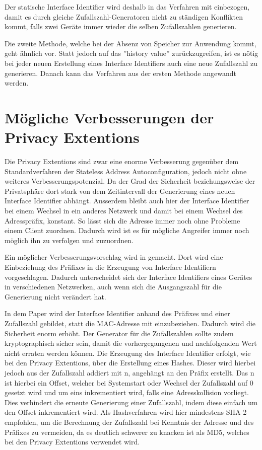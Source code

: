 \documentclass[a4paper, 12pt]{scrartcl}
\begin{document}
Der statische Interface Identifier wird deshalb in das Verfahren mit einbezogen, damit es durch gleiche Zufallszahl-Generatoren nicht zu ständigen Konflikten kommt, falls zwei Geräte immer wieder die selben Zufallszahlen generieren.


Die zweite Methode, welche bei der Absenz von Speicher zur Anwendung kommt, geht ähnlich vor.
Statt jedoch auf das ''history value'' zurückzugreifen, ist es nötig bei jeder neuen Erstellung eines Interface Identifiers auch eine neue Zufallszahl zu generieren. 
Danach kann das Verfahren aus der ersten Methode angewandt werden.

\newpage

\section{Mögliche Verbesserungen der Privacy Extentions}
Die Privacy Extentions sind zwar eine enorme Verbesserung gegenüber dem Standardverfahren der Stateless Address Autoconfiguration, jedoch nicht ohne weiteres Verbesserungspotenzial.
Da der Grad der Sicherheit beziehungsweise der Privatsphäre dort stark von dem Zeitintervall der Generierung eines neuen Interface Identifier abhängt.
Ausserdem bleibt auch hier der Interface Identifier bei einem Wechsel in ein anderes Netzwerk und damit bei einem Wechsel des Adresspräfix, konstant. 
So lässt sich die Adresse immer noch ohne Probleme einem Client zuordnen. Dadurch wird ist es für mögliche Angreifer immer noch möglich ihn zu verfolgen und zuzuordnen.

Ein möglicher Verbesserungsvorschlag wird in \cite{RevIP} gemacht. Dort wird eine Einbeziehung des Präfixes in die Erzeugung von Interface Identifiern vorgeschlagen.
Dadurch unterscheidet sich der Interface Identifiers eines Gerätes in verschiedenen Netzwerken, auch wenn sich die Ausgangszahl für die Generierung nicht verändert hat.

In dem Paper wird der Interface Identifier anhand des Präfixes und einer Zufallszahl gebildet, statt die MAC-Adresse mit einzubeziehen.
Dadurch wird die Sicherheit enorm erhöht.
Der Generator für die Zufallszahlen sollte zudem kryptographisch sicher sein, damit die vorhergegangenen und nachfolgenden Wert nicht erraten werden können.
Die Erzeugung des Interface Identifier erfolgt, wie bei den Privacy Extentions, über die Erstellung eines Hashes.
Dieser wird hierbei jedoch aus der Zufallszahl addiert mit n, angehängt an den Präfix erstellt.
Das n ist hierbei ein Offset, welcher bei Systemstart oder Wechsel der Zufallszahl auf 0 gesetzt wird und um eins inkrementiert wird, falls eine Adresskollision vorliegt.
Dies verhindert die erneute Generierung einer Zufallszahl, indem diese einfach um den Offset inkrementiert wird.
Als Hashverfahren wird hier mindestens SHA-2 empfohlen, um die Berechnung der Zufallszahl bei Kenntnis der Adresse und des Präfixes zu vermeiden, da es deutlich schwerer zu knacken ist als MD5, welches bei den Privacy Extentions verwendet wird.
\end{document}
